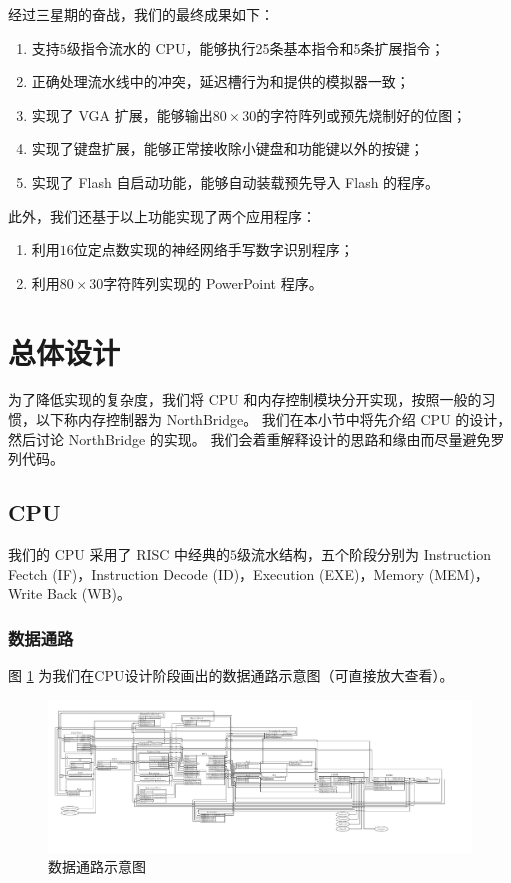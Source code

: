 \documentclass{article}
\begin{document}
经过三星期的奋战，我们的最终成果如下：
\begin{enumerate}
    \item 支持$5$级指令流水的 CPU，能够执行25条基本指令和5条扩展指令；
    \item 正确处理流水线中的冲突，延迟槽行为和提供的模拟器一致；
    \item 实现了 VGA 扩展，能够输出$80 \times 30$的字符阵列或预先烧制好的位图；
    \item 实现了键盘扩展，能够正常接收除小键盘和功能键以外的按键；
    \item 实现了 Flash 自启动功能，能够自动装载预先导入 Flash 的程序。
\end{enumerate}
此外，我们还基于以上功能实现了两个应用程序：
\begin{enumerate}
    \item 利用$16$位定点数实现的神经网络手写数字识别程序；
    \item 利用$80 \times 30$字符阵列实现的 PowerPoint 程序。
\end{enumerate}

\section{总体设计}

为了降低实现的复杂度，我们将 CPU 和内存控制模块分开实现，按照一般的习惯，以下称内存控制器为 NorthBridge。
我们在本小节中将先介绍 CPU 的设计，然后讨论 NorthBridge 的实现。
我们会着重解释设计的思路和缘由而尽量避免罗列代码。

\subsection{CPU}

我们的 CPU 采用了 RISC 中经典的$5$级流水结构，五个阶段分别为 Instruction Fectch (IF)，Instruction Decode (ID)，Execution (EXE)，Memory (MEM)，Write Back (WB)。

\subsubsection{数据通路}

图 \ref{fig:datapath} 为我们在CPU设计阶段画出的数据通路示意图（可直接放大查看）。

\begin{figure}[ht]
\centering
\includegraphics[width=\textwidth]{datapath.pdf}
\caption{数据通路示意图}
\label{fig:datapath}
\end{figure}
\end{document}
